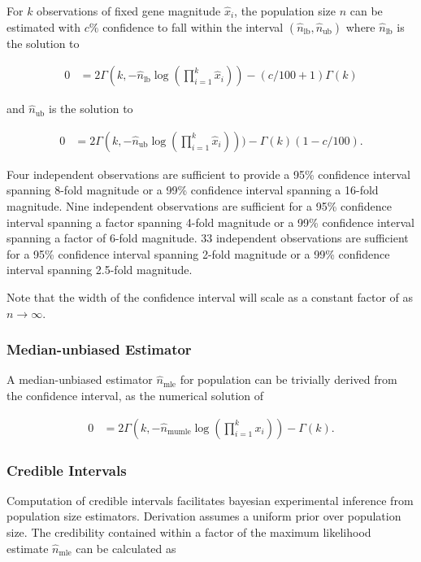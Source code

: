 For $k$ observations of fixed gene magnitude $\hat{x}_i$, the population size $n$ can be estimated with $c\%$ confidence to fall within the interval $(\hat{n}_\mathrm{lb}, \hat{n}_\mathrm{ub})$ where $\hat{n}_\mathrm{lb}$ is the solution to

\begin{align} \label{eqn:popsize_mle_ci_lb}
0
&= 2\Gamma(k, -\hat{n}_\mathrm{lb}\log(\prod_{i=1}^k\hat{x}_i)) - (c/100+1)\Gamma(k)
\end{align}

and $\hat{n}_\mathrm{ub}$ is the solution to

\begin{align} \label{eqn:popsize_mle_ci_ub}
  0
  &= 2\Gamma(k, -\hat{n}_\mathrm{ub}\log(\prod_{i=1}^k\hat{x}_i))) - \Gamma(k)(1-c/100).
\end{align}

Four independent observations are sufficient to provide a 95\% confidence interval spanning 8-fold magnitude or a 99\% confidence interval spanning a 16-fold magnitude.
Nine independent observations are sufficient for a 95\% confidence interval spanning a factor spanning 4-fold magnitude or a 99\% confidence interval spanning a factor of 6-fold magnitude.
33 independent observations are sufficient for a 95\% confidence interval spanning 2-fold magnitude or a 99\% confidence interval spanning 2.5-fold magnitude.

Note that the width of the confidence interval will scale as a constant factor of as $n \to \infty$.

\subsubsection{Median-unbiased Estimator}

A median-unbiased estimator $\hat{n}_\mathrm{mle}$ for population can be trivially derived from the confidence interval, as the numerical solution of

\begin{align*}
0
&= 2\Gamma(k, -\hat{n}_\mathrm{mumle}\log(\prod_{i=1}^k x_i)) - \Gamma(k).
\end{align*}

\subsubsection{Credible Intervals}

Computation of credible intervals facilitates bayesian experimental inference from population size estimators.
Derivation assumes a uniform prior over population size.
The credibility contained within a factor of the maximum likelihood estimate $\hat{n}_\mathrm{mle}$ can be calculated as


